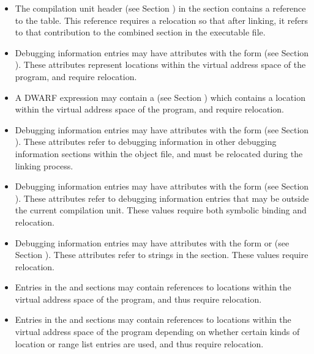 \begin{itemize}
\item The compilation unit header (see Section 
) in the \dotdebuginfo{}
section contains a reference to the \dotdebugabbrev{} table. This
reference requires a relocation so that after linking, it refers to
that contribution to the combined \dotdebugabbrev{} section in the
executable file.

\item Debugging information entries may have attributes with the form
\DWFORMaddr{} (see Section ). 
These attributes represent locations
within the virtual address space of the program, and require
relocation.

\item A DWARF expression may contain a \DWOPaddr{} (see Section 
) which contains a location within 
the virtual address space of the program, and require relocation.

\item Debugging information entries may have attributes with the form
\DWFORMsecoffset{} (see Section ). 
These attributes refer to
debugging information in other debugging information sections within
the object file, and must be relocated during the linking process.

\item Debugging information entries may have attributes with the form
\DWFORMrefaddr{} (see Section ). 
These attributes refer to
debugging information entries that may be outside the current
compilation unit. These values require both symbolic binding and
relocation.

\item Debugging information entries may have attributes with the form
\DWFORMstrp{} 
\bb
or \DWFORMstrpeight{}
\eb
(see Section ). 
These attributes refer to strings in
the \dotdebugstr{} section. These values require relocation.

\item Entries in the \dotdebugaddr{} and \dotdebugaranges{}
sections may contain references to locations within the virtual address
space of the program, and thus require relocation.

\item Entries in the \dotdebugloclists{} and \dotdebugrnglists{} sections may
contain references to locations within the virtual address space of the 
program depending on whether certain kinds of location or range
list entries are used, and thus require relocation.


\end{itemize}
